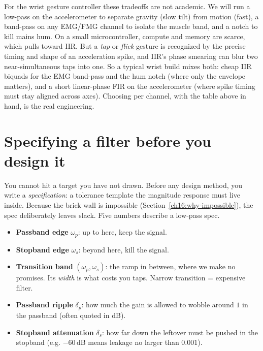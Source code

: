 \begin{goalbox}
For the wrist gesture controller these tradeoffs are not academic. We will run a
low-pass on the accelerometer to separate gravity (slow tilt) from motion (fast),
a band-pass on any EMG/FMG channel to isolate the muscle band, and a notch to kill
mains hum. On a small microcontroller, compute and memory are scarce, which pulls
toward IIR. But a \emph{tap} or \emph{flick} gesture is recognized by the precise
timing and shape of an acceleration spike, and IIR's phase smearing can blur two
near-simultaneous taps into one. So a typical wrist build mixes both: cheap IIR
biquads for the EMG band-pass and the hum notch (where only the envelope matters),
and a short linear-phase FIR on the accelerometer (where spike timing must stay
aligned across axes). Choosing per channel, with the table above in hand, is the
real engineering.
\end{goalbox}

\section{Specifying a filter before you design it}
\label{ch16:spec}

You cannot hit a target you have not drawn. Before any design method, you write a
\emph{specification}: a tolerance template the magnitude response must live inside.
Because the brick wall is impossible (Section~\ref{ch16:why-impossible}), the spec
deliberately leaves slack. Five numbers describe a low-pass spec.

\begin{itemize}
\item \textbf{Passband edge} $\omega_p$: up to here, keep the signal.
\item \textbf{Stopband edge} $\omega_s$: beyond here, kill the signal.
\item \textbf{Transition band} $(\omega_p, \omega_s)$: the ramp in between, where
we make no promises. Its \emph{width} is what costs you taps. Narrow transition =
expensive filter.
\item \textbf{Passband ripple} $\delta_p$: how much the gain is allowed to wobble
around $1$ in the passband (often quoted in dB).
\item \textbf{Stopband attenuation} $\delta_s$: how far down the leftover must be
pushed in the stopband (e.g. $-60$\,dB means leakage no larger than $0.001$).
\end{itemize}


